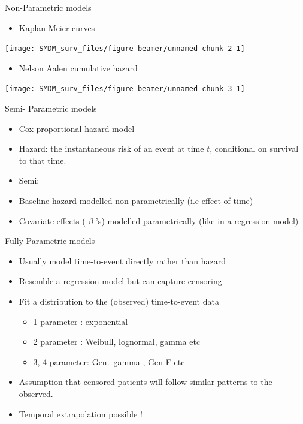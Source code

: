 \documentclass[ignorenonframetext,]{beamer}
\providecommand{\tightlist}{%
  \setlength{\itemsep}{0pt}\setlength{\parskip}{0pt}}
\begin{document}
\begin{frame}{Non-Parametric models}

\begin{itemize}
\tightlist
\item
  Kaplan Meier curves
\end{itemize}

\texttt{[image: SMDM\_surv\_files/figure-beamer/unnamed-chunk-2-1]}

\end{frame}

\begin{frame}

\begin{itemize}
\tightlist
\item
  Nelson Aalen cumulative hazard
\end{itemize}

\texttt{[image: SMDM\_surv\_files/figure-beamer/unnamed-chunk-3-1]}

\end{frame}

\begin{frame}{Semi- Parametric models}

\begin{itemize}
\tightlist
\item
  Cox proportional hazard model
\item
  Hazard: the instantaneous risk of an event at time \(t\), conditional
  on survival to that time.
\item
  Semi:
\item
  Baseline hazard modelled non parametrically (i.e effect of time)
\item
  Covariate effects ( \(\beta\) 's) modelled parametrically (like in a
  regression model)
\end{itemize}

\end{frame}

\begin{frame}{Fully Parametric models}

\begin{itemize}
\tightlist
\item
  Usually model time-to-event directly rather than hazard
\item
  Resemble a regression model but can capture censoring
\item
  Fit a distribution to the (observed) time-to-event data

  \begin{itemize}
  \tightlist
  \item
    1 parameter : exponential
  \item
    2 parameter : Weibull, lognormal, gamma etc
  \item
    3, 4 parameter: Gen.~gamma , Gen F etc
  \end{itemize}
\item
  Assumption that censored patients will follow similar patterns to the
  observed.
\item
  Temporal extrapolation possible !
\end{itemize}

\end{frame}
\end{document}
